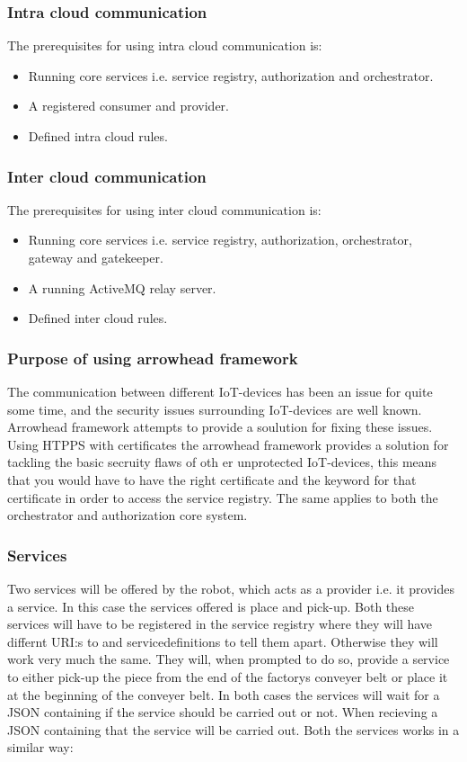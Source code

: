 \subsubsection{Intra cloud communication}
The prerequisites for using intra cloud communication is:
\begin{itemize}
    \item Running core services i.e. service registry, authorization and orchestrator.
    \item A registered consumer and provider.
    \item Defined intra cloud rules.
\end{itemize}

\subsubsection{Inter cloud communication}
The prerequisites for using inter cloud communication is:
\begin{itemize}
    \item Running core services i.e. service registry, authorization, orchestrator, gateway and gatekeeper.
    \item A running ActiveMQ relay server.
    \item Defined inter cloud rules.
\end{itemize}

\subsubsection{Purpose of using arrowhead framework}
The communication between different IoT-devices has been an issue for quite some time, and the security issues surrounding IoT-devices
are well known. Arrowhead framework attempts to provide a soulution for fixing these issues. Using HTPPS with certificates the arrowhead
framework provides a solution for tackling the basic secruity flaws of oth er unprotected IoT-devices, this means that you would have to have
the right certificate and the keyword for that certificate in order to access the service registry. The same applies to both the orchestrator
and authorization core system. 

\subsubsection{Services}
Two services will be offered by the robot, which acts as a provider i.e. it provides a service. In this case the services offered
is place and pick-up. Both these services will have to be registered in the service registry where they will have differnt URI:s 
to and servicedefinitions to tell them apart. Otherwise they will work very much the same. They will, when prompted to do so, provide a
service to either pick-up the piece from the end of the factorys conveyer belt or place it at the beginning of the conveyer belt. 
In both cases the services will wait for a JSON containing if the service should be carried out or not. When recieving a JSON containing that the service will be carried out. Both the services
works in a similar way:

